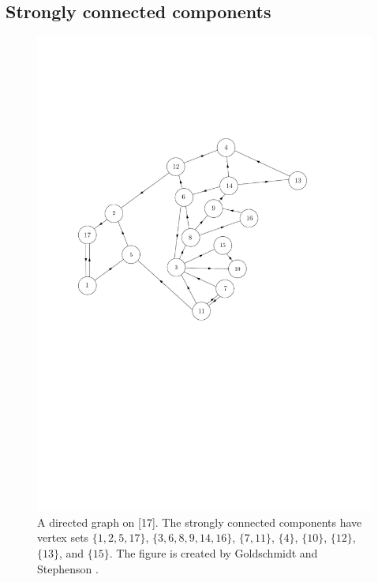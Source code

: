 \subsection{Strongly connected components}
\begin{figure}
    \centering
    \includegraphics[scale=0.6]{Content/Pictures/biggraph2.pdf}
    \caption{A directed graph on [17]. The strongly connected components have vertex sets $\{1,2,5,17\}$, $\{3,6,8,9,14,16\}$, $\{7,11\}$, $\{4\}$, $\{10\}$, $\{12\}$, $\{13\}$, and $\{15\}$. The figure is created by Goldschmidt and Stephenson \cite{goldschmidtScalingLimitCritical2019}.}
    \label{fig.SCCs}
\end{figure}


